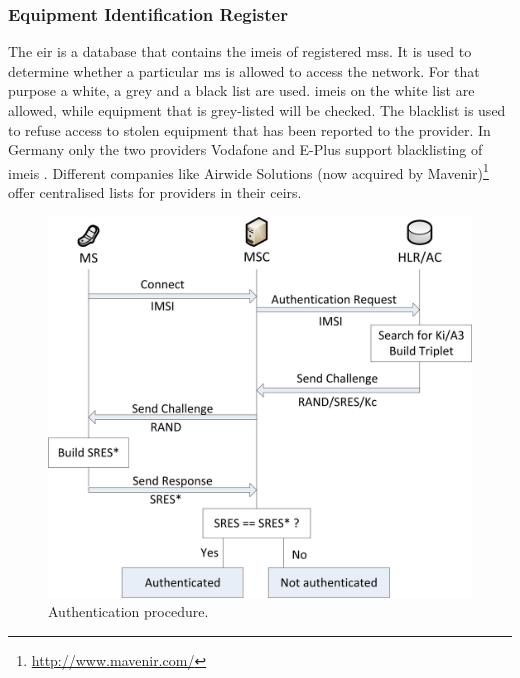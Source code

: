 \subsubsection{Equipment Identification Register}
The \gls{eir} is a database that contains the \glspl{imei} of registered \glspl{ms}.
It is used to determine whether a particular \gls{ms} is allowed to access the network.
For that purpose a white, a grey and a black list are used.
\glspl{imei} on the white list are allowed, while equipment that is grey-listed will be checked.
The blacklist is used to refuse access to \eg stolen equipment that has been reported to the provider.
In Germany only the two providers Vodafone and E-Plus support blacklisting of \glspl{imei} \cite{blacklisting}.
Different companies like Airwide Solutions (now acquired by Mavenir)\footnote{\url{http://www.mavenir.com/}} offer centralised lists for providers in their \glspl{ceir}.

\begin{figure}
\centering
\includegraphics{../Images/Authentication}
\caption{Authentication procedure.}
\label{fig:authentication}
\end{figure}

